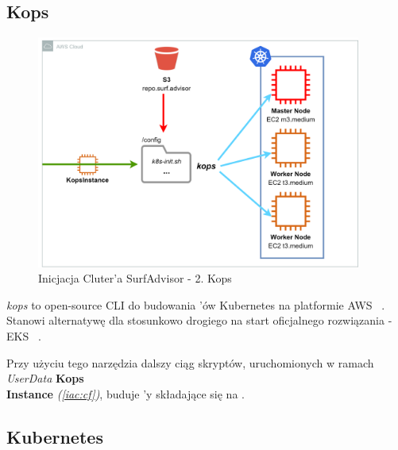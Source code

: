 \subsection{Kops}
\label{iac:kops}

\begin{figure}[H]
	\begin{center}
		\includegraphics[width=0.95\textwidth]{img/IAC-step2}
	\end{center}
	\caption{Inicjacja Cluter'a SurfAdvisor - 2. Kops}
\end{figure}

\emph{kops} to open-source CLI do budowania 'ów Kubernetes na platformie AWS ~\cite{kops-k8s}.
Stanowi alternatywę dla stosunkowo drogiego na start oficjalnego rozwiązania - EKS ~\cite{eks-pricing}.

Przy użyciu tego narzędzia dalszy ciąg skryptów, uruchomionych w ramach \emph{UserData} \textbf{Kops\\Instance} \emph{(\ref{iac:cf})}, buduje 'y składające się na .


\subsection{Kubernetes}
\label{iac:kubectl}

